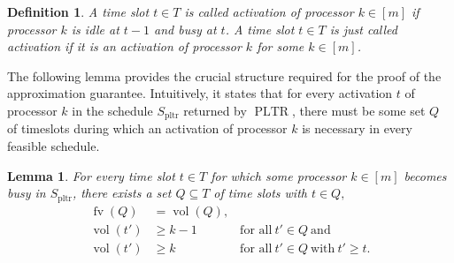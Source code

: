 \documentclass[a4paper]{article}
\DeclareMathOperator{\pltr}{pltr}
\DeclareMathOperator{\PLTR}{PLTR}
\DeclareMathOperator{\fv}{fv}
\DeclareMathOperator{\vol}{vol}
\newtheorem{lemma}[theorem]{Lemma}
\newtheorem{definition}[theorem]{Definition}
\begin{document}
\begin{definition}
  A time slot $t \in T$ is called \emph{activation of processor $k \in [m]$} if processor $k$ is idle at $t-1$ and busy at $t$.
  A time slot $t \in T$ is just called \emph{activation} if it is an activation of processor $k$ for some $k \in [m]$.
\end{definition}
The following lemma provides the crucial structure required for the proof of the approximation guarantee.
Intuitively, it states that for every activation $t$ of processor $k$ in the schedule $S_{\pltr}$ returned by $\PLTR$, there must be some set $Q$ of timeslots during which an activation of processor $k$ is necessary in every feasible schedule.
\begin{lemma}\label{lemma:critical}
  For every time slot $t \in T$ for which some processor $k \in [m]$ becomes busy in $S_{\pltr}$, there exists a set $Q \subseteq T$ of time slots with $t \in Q, $
  \begin{align}
    \fv(Q) &= \vol(Q) \text{,}\\
    \vol(t') &\geq k-1 &~\text{for all}~t' \in Q~\text{and}\\
    \vol(t') &\geq k &~\text{for all}~t' \in Q~\text{with}~t' \geq t \text{.}
  \end{align}
\end{lemma}
\end{document}

